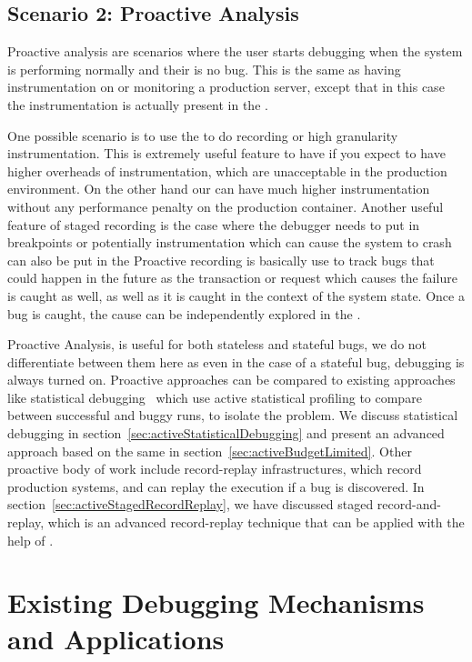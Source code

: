 \subsection{Scenario 2: Proactive Analysis}
\label{sec:activeProactiveAnalysis}

Proactive analysis are scenarios where the user starts debugging when the system is performing normally and their is no bug. This is the same as having instrumentation on or monitoring a production server, except that in this case the instrumentation is actually present in the \debugcontainer.

One possible scenario is to use the \debugcontainer to do recording or high granularity instrumentation. This is extremely useful feature to have if you expect to have higher overheads of instrumentation, which are unacceptable in the production environment. 
On the other hand our \debugcontainer can have much higher instrumentation without any performance penalty on the production container.
Another useful feature of staged recording is the case where the debugger needs to put in breakpoints or potentially instrumentation which can cause the system to crash can also be put in the \debugcontainer
Proactive recording is basically use to track bugs that could happen in the future as the transaction or request which causes the failure is caught as well, as well as it is caught in the context of the system state. 
Once a bug is caught, the cause can be independently explored in the \debugcontainer.

Proactive Analysis, is useful for both stateless and stateful bugs, we do not differentiate between them here as even in the case of a stateful bug, debugging is always turned on. 
Proactive approaches can be compared to existing approaches like statistical debugging~\cite{statisticalDebugging} which use active statistical profiling to compare between successful and buggy runs, to isolate the problem. We discuss statistical debugging in section~\ref{sec:activeStatisticalDebugging} and present an advanced approach based on the same in section~\ref{sec:activeBudgetLimited}.
Other proactive body of work include record-replay infrastructures, which record production systems, and can replay the execution if a bug is discovered.
In section~\ref{sec:activeStagedRecordReplay}, we have discussed staged record-and-replay, which is an advanced record-replay technique that can be applied with the help of \parikshan.



\section{Existing Debugging Mechanisms and Applications}
\label{sec:activeExistingTechniques}

